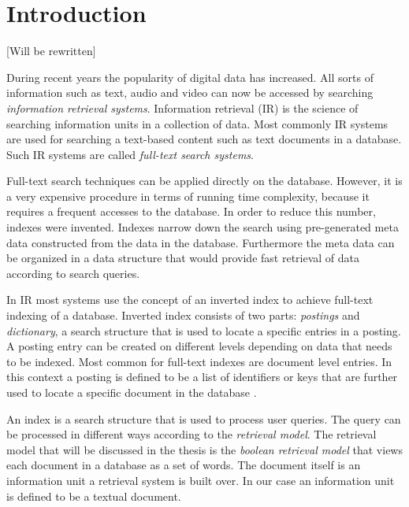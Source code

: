\section{Introduction} \label{c:introduction}
[Will be rewritten]
%

During recent years the popularity of digital data has increased. All sorts of 
information such as text, audio and video can now be accessed by searching 
\emph{information retrieval systems}. Information retrieval (IR) is the science of 
searching information units in a collection of data. Most commonly IR systems 
are used for searching a text-based content such as text documents in a database. 
Such IR systems are called \emph{full-text search systems}. 

Full-text search techniques can be applied directly on the database. However, 
it is a very expensive procedure in terms of running time complexity, because it 
requires a frequent accesses to the database. In order to reduce this number, indexes 
were invented. Indexes narrow down the search using pre-generated meta data 
constructed from the data in the database. Furthermore the meta data can be 
organized in a data structure that would provide fast retrieval of data according 
to search queries.

In IR most systems use the concept of an inverted index to achieve full-text 
indexing of a database. Inverted index consists of two parts: \emph{postings} 
and \emph{dictionary}, a search structure that is used to locate a specific entries 
in a posting. A posting entry can be created on different levels depending on data 
that needs to be indexed. Most common for full-text indexes are document level 
entries. In this context a posting is defined to be a list of identifiers or keys that are 
further used to locate a specific document in the database \cite{zobel1992efficient}.

An index is a search structure that is used to process user queries. The query 
can be processed in different ways according to the \emph{retrieval model}. The 
retrieval model that will be discussed in the thesis is the \emph{boolean retrieval 
model} that views each document in a database as a set of words. The document 
itself is an information unit a retrieval system is built over. In our case an 
information unit is defined to be a textual document. 

